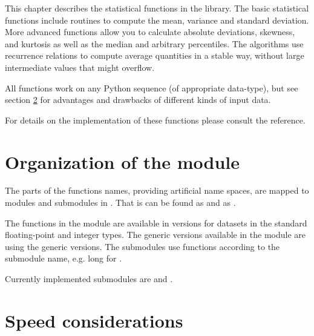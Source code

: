 
This chapter describes the statistical functions in the library.  The basic
statistical functions include routines to compute the mean, variance and
standard deviation. More advanced functions allow you to calculate absolute
deviations, skewness, and kurtosis as well as the median and arbitrary
percentiles.  The algorithms use recurrence relations to compute average
quantities in a stable way, without large intermediate values that might
overflow.

All functions work on any Python sequence (of appropriate data-type), but see
section \ref{sec:stat-speed-considerations} for advantages and drawbacks of
different kinds of input data.

\begin{seealso}
   For details on the implementation of these functions please consult the
   \GSL{} reference.
\end{seealso}


\section{Organization of the module}
\label{sec:stat-organization}

The parts of the \gsl{} functions names, providing artificial name spaces, are
mapped to modules and submodules in \pygsl{}.  That is 
can be found as  and  as
.

The functions in the module are available in versions for datasets in the
standard floating-point and integer types. The generic versions available in
the  module are using the generic \gsl{} 
versions.  The submodules use \gsl{} functions according to the submodule name,
e.g. long for .

Currently implemented submodules are  and
.



\section{Speed considerations}
\label{sec:stat-speed-considerations}

